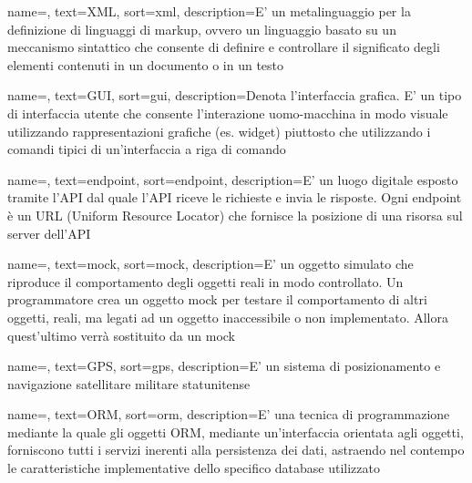 {
    name=,
    text=XML,
    sort=xml,
    description={E' un metalinguaggio per la definizione di linguaggi di markup, ovvero un linguaggio basato su un meccanismo sintattico che consente di definire e controllare il significato degli elementi contenuti in un documento o in un testo}
}

{
    name=,
    text=GUI,
    sort=gui,
    description={Denota l'interfaccia grafica. E' un tipo di interfaccia utente che consente l'interazione uomo-macchina in modo visuale utilizzando rappresentazioni grafiche (es. widget) piuttosto che utilizzando i comandi tipici di un'interfaccia a riga di comando}
}

{
    name=,
    text=endpoint,
    sort=endpoint,
    description={E' un luogo digitale esposto tramite l'API dal quale l'API riceve le richieste e invia le risposte. Ogni endpoint è un URL (Uniform Resource Locator) che fornisce la posizione di una risorsa sul server dell'API}
}

{
    name=,
    text=mock,
    sort=mock,
    description={E' un oggetto simulato che riproduce il comportamento degli oggetti reali in modo controllato. Un programmatore crea un oggetto mock per testare il comportamento di altri oggetti, reali, ma legati ad un oggetto inaccessibile o non implementato. Allora quest'ultimo verrà sostituito da un mock}
}

{
    name=,
    text=GPS,
    sort=gps,
    description={E' un sistema di posizionamento e navigazione satellitare militare statunitense}
}


{
    name=,
    text=ORM,
    sort=orm,
    description={E' una tecnica di programmazione mediante la quale gli oggetti ORM, mediante un'interfaccia orientata agli oggetti, forniscono tutti i servizi inerenti alla persistenza dei dati, astraendo nel contempo le caratteristiche implementative dello specifico database utilizzato}
}

